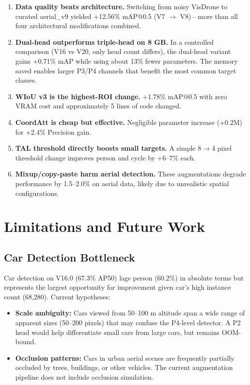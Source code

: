 \documentclass[11pt]{article}
\begin{document}
\begin{enumerate}[leftmargin=*]
    \item \textbf{Data quality beats architecture.} Switching from noisy VisDrone to curated
          aerial\_v9 yielded +12.56\% mAP@0.5 (V7 $\rightarrow$ V8)—more than all four
          architectural modifications combined.
    \item \textbf{Dual-head outperforms triple-head on 8 GB.} In a controlled comparison (V16
          vs V20, only head count differs), the dual-head variant gains +0.71\% mAP while using
          about 13\% fewer parameters. The memory saved enables larger P3/P4 channels that
          benefit the most common target classes.
    \item \textbf{WIoU v3 is the highest-ROI change.} +1.78\% mAP@0.5 with zero VRAM cost and
          approximately 5 lines of code changed.
    \item \textbf{CoordAtt is cheap but effective.} Negligible parameter increase (+0.2M) for
          +2.4\% Precision gain.
    \item \textbf{TAL threshold directly boosts small targets.} A simple 8$\rightarrow$4 pixel
          threshold change improves person and cycle by +6--7\% each.
    \item \textbf{Mixup/copy-paste harm aerial detection.} These augmentations degrade performance
          by 1.5--2.0\% on aerial data, likely due to unrealistic spatial configurations.
\end{enumerate}

\section{Limitations and Future Work}

\subsection{Car Detection Bottleneck}

Car detection on V16.0 (67.3\% AP50) lags person (60.2\%) in absolute terms but represents the
largest opportunity for improvement given car's high instance count (68,280). Current hypotheses:

\begin{itemize}[leftmargin=*]
    \item \textbf{Scale ambiguity:} Cars viewed from 50--100 m altitude span a wide range of
          apparent sizes (50--200 pixels) that may confuse the P4-level detector. A P2 head
          would help differentiate small cars from large cars, but remains OOM-bound.
    \item \textbf{Occlusion patterns:} Cars in urban aerial scenes are frequently partially
          occluded by trees, buildings, or other vehicles. The current augmentation pipeline
          does not include occlusion simulation.
\end{itemize}
\end{document}
